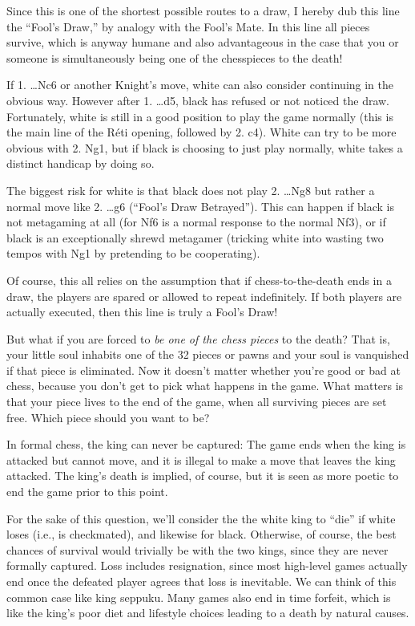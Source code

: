 \documentclass[twocolumn]{article}
\begin{document}
{\clearpage

  Since this is one of the shortest possible routes to a draw, I
  hereby dub this line the ``Fool's Draw,'' by analogy with the Fool's
  Mate. In this line all pieces survive, which is anyway humane and
  also advantageous in the case that you or someone is simultaneously
  being one of the chesspieces to the death!

  If 1. \ldots Nc6 or another Knight's move, white can also consider
  continuing in the obvious way. However after 1. \ldots d5, black has
  refused or not noticed the draw. Fortunately, white is still in a
  good position to play the game normally (this is the main line of
  the R\'eti opening, followed by 2. c4). White can try to be more
  obvious with 2. Ng1, but if black is choosing to just play normally,
  white takes a distinct handicap by doing so.

  The biggest risk for white is that black does not play 2. \ldots Ng8
  but rather a normal move like 2. \ldots g6 (``Fool's Draw Betrayed'').
  This can happen if black is not metagaming at all (for Nf6 is a
  normal response to the normal Nf3), or if black is an exceptionally
  shrewd metagamer (tricking white into wasting two tempos with Ng1
  by pretending to be cooperating).

  Of course, this all relies on the assumption that if
  chess-to-the-death ends in a draw, the players are spared or allowed
  to repeat indefinitely. If both players are actually executed, then
  this line is truly a Fool's Draw!
}

But what if you are forced to {\it be one of the chess pieces} to the
death? That is, your little soul inhabits one of the 32 pieces or
pawns and your soul is vanquished if that piece is eliminated. Now it
doesn't matter whether you're good or bad at chess, because you don't
get to pick what happens in the game. What matters is that your piece
lives to the end of the game, when all surviving pieces are set free.
Which piece should you want to be?

In formal chess, the king can never be captured: The game ends when
the king is attacked but cannot move, and it is illegal to make a move
that leaves the king attacked. The king's death is implied, of course,
but it is seen as more poetic to end the game prior to this point.

For the sake of this question, we'll consider the the white king to
``die'' if white loses (i.e., is checkmated), and likewise for black.
Otherwise, of course, the best chances of survival would trivially be
with the two kings, since they are never formally captured. Loss
includes resignation, since most high-level games actually end once
the defeated player agrees that loss is inevitable. We can think of
this common case like king seppuku. Many games also end in time
forfeit, which is like the king's poor diet and lifestyle choices
leading to a death by natural causes.
\end{document}
